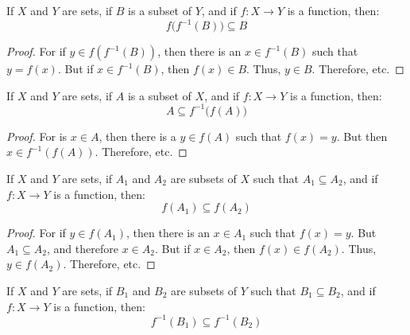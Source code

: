 \documentclass[crop=false,class=book,oneside]{standalone}
\begin{document}
        \begin{theorem}
            If $X$ and $Y$ are sets, if $B$ is a subset of $Y$,
            and if $f:X\rightarrow{Y}$ is a function, then:
            \begin{equation}
                f\big(f^{-1}(B)\big)\subseteq{B}
            \end{equation}
        \end{theorem}
        \begin{proof}
            For if $y\in{f(f^{-1}(B))}$, then there is an
            $x\in{f^{-1}(B)}$ such that $y=f(x)$. But if
            $x\in{f^{-1}(B)}$, then $f(x)\in{B}$. Thus,
            $y\in{B}$. Therefore, etc.
        \end{proof}
        \begin{theorem}
            If $X$ and $Y$ are sets, if $A$ is a subset of $X$,
            and if $f:X\rightarrow{Y}$ is a function, then:
            \begin{equation}
                A\subseteq{f^{-1}}\big(f(A)\big)
            \end{equation}
        \end{theorem}
        \begin{proof}
            For is $x\in{A}$, then there is a
            $y\in{f}(A)$ such that $f(x)=y$. But then
            $x\in{f^{-1}(f(A))}$. Therefore, etc.
        \end{proof}
        \begin{theorem}
            If $X$ and $Y$ are sets, if $A_{1}$ and $A_{2}$ are subsets of
            $X$ such that $A_{1}\subseteq{A}_{2}$, and if $f:X\rightarrow{Y}$
            is a function, then:
            \begin{equation}
                f(A_{1})\subseteq{f}(A_{2})
            \end{equation}
        \end{theorem}
        \begin{proof}
            For if $y\in{f}(A_{1})$, then there is an $x\in{A}_{1}$ such that
            $f(x)=y$. But $A_{1}\subseteq{A}_{2}$, and therefore $x\in{A}_{2}$.
            But if $x\in{A}_{2}$, then $f(x)\in{f}(A_{2})$. Thus, $y\in{f}(A_{2})$.
            Therefore, etc.
        \end{proof}
        \begin{theorem}
            If $X$ and $Y$ are sets, if $B_{1}$ and $B_{2}$ are subsets of
            $Y$ such that $B_{1}\subseteq{B}_{2}$, and if $f:X\rightarrow{Y}$
            is a function, then:
            \begin{equation}
                f^{-1}(B_{1})\subseteq{f^{-1}}(B_{2})
            \end{equation}
        \end{theorem}
\end{document}
